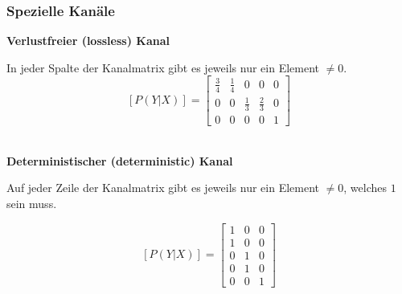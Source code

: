 \subsubsection{Spezielle Kanäle}
\textbf{Verlustfreier (lossless) Kanal} \\
\begin{minipage}{14cm}
	In jeder Spalte der Kanalmatrix gibt es jeweils nur ein  Element $\neq 0$. \\

	$$ [P(Y | X)] = \begin{bmatrix}
              \frac34 & \frac14 & 0 & 0 & 0 \\
              0 & 0 & \frac13 & \frac23 & 0 \\
              0 & 0 & 0 & 0 & 1
           \end{bmatrix}$$ \\
\end{minipage}
\begin{minipage}{5cm}
\begin{center}
\end{center}
\end{minipage}

\textbf{Deterministischer (deterministic) Kanal} \\
\begin{minipage}{14cm}
	Auf jeder Zeile der Kanalmatrix gibt es jeweils nur ein  Element $\neq 0$, welches $1$ sein
	muss.

	$$ [P(Y | X)] = \begin{bmatrix}
           		1 & 0 & 0 \\
           		1 & 0 & 0 \\
           		0 & 1 & 0 \\
           		0 & 1 & 0 \\
           		0 & 0 & 1
           \end{bmatrix}$$
\end{minipage}
\begin{minipage}{5cm}
\begin{center}
\end{center}
\end{minipage}

